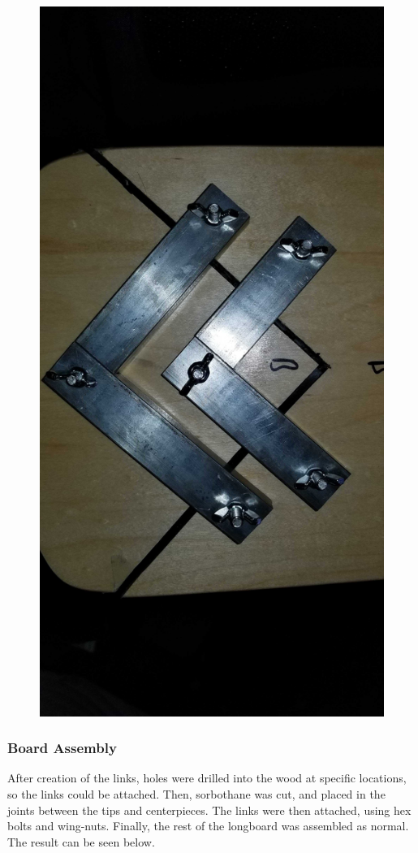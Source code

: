 \documentclass[letterpaper,12pt]{article}
\begin{document}
\begin{figure}[!htbp]\centering
\begin{minipage}{.5\textwidth}\centering
\includegraphics[width=.8\textwidth]{figs/links-closeup.jpg}
\label{links-closeup}
\end{minipage}
\end{figure}

\subsubsection{Board Assembly}
After creation of the links, holes were drilled into the wood at specific locations, so the links could be attached. Then, sorbothane was cut, and placed in the joints between the tips and centerpieces. The links were then attached, using hex bolts and wing-nuts. Finally, the rest of the longboard was assembled as normal. The result can be seen below.
\end{document}
